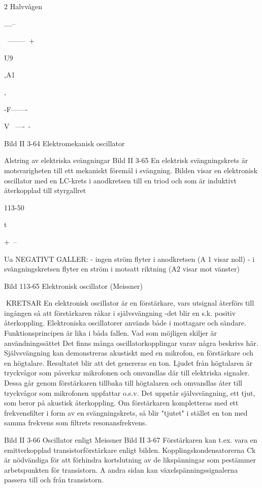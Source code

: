 {{{{2 Halvvågen

....--~

~--------~+

U9

,A1

,

-F-------~

V
~----~-

Bild II 3-64 Elektromekanisk oscillator

Alstring av elektriska svängningar
Bild II 3-65
En elektrisk svängningskrets är motsvarigheten till ett mekaniskt föremål i svängning.
Bilden visar en elektronisk oscillator med en
LC-krets i anodkretsen till en triod och som
är induktivt återkopplad till styrgallret

113-50

t

+~--~

Ua
NEGATIVT GALLER:
- ingen ström flyter i anodkretsen
(A 1 visar noll)
- i svängningskretsen flyter en ström
i motsatt riktning
(A2 visar mot vänster)

Bild 113-65 Elektronisk oscillator (Meissner)

KRETSAR
En elektronisk oscillator är en förstärkare, vars utsignal återförs till ingången så
att förstärkaren råkar i självsvängning -det
blir en s.k. positiv återkoppling.
Elektroniska oscillatorer används både i
mottagare och sändare. Funktionsprincipen
är lika i båda fallen. Vad som möjligen skiljer
är användningssättet Det finns många oscillatorkopplingar varav några beskrivs här.
Självsvängning kan demonstreras akustiskt med en mikrofon, en förstärkare och en
högtalare. Resultatet blir att det genereras
en ton. Ljudet från högtalaren är tryckvågor
som påverkar mikrofonen och omvandlas
där till elektriska signaler. Dessa går genom
förstärkaren tillbaka till högtalaren och omvandlas åter till tryckvågor som mikrofonen
uppfattar o.s.v. Det uppstår självsvängning,
ett tjut, som beror på akustisk återkoppling.
Om förstärkaren kompletteras med ett frekvensfilter i form av en svängningskrets, så
blir "tjutet" i stället en ton med samma frekvens som filtrets resonansfrekvens.

Bild II 3-66 Oscillator enligt Meissner
Bild II 3-67
Förstärkaren kan t.ex. vara en emitterkopplad transistorförstärkare enligt bilden.
Kopplingskondensatorerna Ck är nödvändiga för att förhindra kortslutning av de likspänningar som pestämmer arbetspunkten
för transistorn. A andra sidan kan växelspänningssignalerna passera till och från
transistorn.

}}}}
